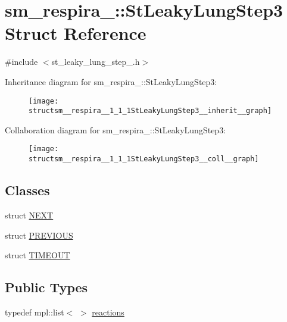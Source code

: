 \hypertarget{structsm__respira__1_1_1StLeakyLungStep3}{}\section{sm\+\_\+respira\+\_\+:\+:St\+Leaky\+Lung\+Step3 Struct Reference}
\label{structsm__respira__1_1_1StLeakyLungStep3}


{\ttfamily \#include $<$st\+\_\+leaky\+\_\+lung\+\_\+step\+\_.\+h$>$}



Inheritance diagram for sm\+\_\+respira\+\_\+:\+:St\+Leaky\+Lung\+Step3\+:
\nopagebreak
\begin{figure}[H]
\begin{center}
\leavevmode
\texttt{[image: structsm\_\_respira\_\_1\_1\_1StLeakyLungStep3\_\_inherit\_\_graph]}
\end{center}
\end{figure}


Collaboration diagram for sm\+\_\+respira\+\_\+:\+:St\+Leaky\+Lung\+Step3\+:
\nopagebreak
\begin{figure}[H]
\begin{center}
\leavevmode
\texttt{[image: structsm\_\_respira\_\_1\_1\_1StLeakyLungStep3\_\_coll\_\_graph]}
\end{center}
\end{figure}
\subsection*{Classes}
\begin{DoxyCompactItemize}
\item 
struct \hyperlink{structsm__respira__1_1_1StLeakyLungStep3_1_1NEXT}{N\+E\+XT}
\item 
struct \hyperlink{structsm__respira__1_1_1StLeakyLungStep3_1_1PREVIOUS}{P\+R\+E\+V\+I\+O\+US}
\item 
struct \hyperlink{structsm__respira__1_1_1StLeakyLungStep3_1_1TIMEOUT}{T\+I\+M\+E\+O\+UT}
\end{DoxyCompactItemize}
\subsection*{Public Types}
\begin{DoxyCompactItemize}
\item 
typedef mpl\+::list$<$ $>$ \hyperlink{structsm__respira__1_1_1StLeakyLungStep3_a5f16ee57548be4a1487c0dc6c9965737}{reactions}
\end{DoxyCompactItemize}
